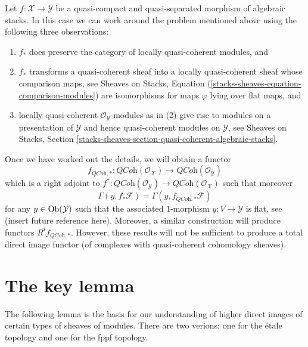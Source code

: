 \medskip\noindent
Let $f : \mathcal{X} \to \mathcal{Y}$ be a quasi-compact and
quasi-separated morphism of algebraic stacks. In this case we can
work around the problem mentioned above using the following
three observations:
\begin{enumerate}
\item $f_*$ does preserve the category of locally quasi-coherent modules, and
\item $f_*$ transforms a quasi-coherent sheaf into a locally quasi-coherent
sheaf whose comparison maps, see
Sheaves on Stacks, Equation (\ref{stacks-sheaves-equation-comparison-modules})
are isomorphisms for maps $\varphi$ lying over flat maps, and
\item locally quasi-coherent $\mathcal{O}_\mathcal{Y}$-modules as in (2)
give rise to modules on a presentation of $\mathcal{Y}$ and hence
quasi-coherent modules on $\mathcal{Y}$, see
Sheaves on Stacks, Section
\ref{stacks-sheaves-section-quasi-coherent-algebraic-stacks}.
\end{enumerate}
Once we have worked out the details, we will obtain a functor
$$
f_{\textit{QCoh}, *} :
\textit{QCoh}(\mathcal{O}_\mathcal{X})
\longrightarrow
\textit{QCoh}(\mathcal{O}_\mathcal{Y})
$$
which is a right adjoint to
$f^* : \textit{QCoh}(\mathcal{O}_\mathcal{Y}) \to
\textit{QCoh}(\mathcal{O}_\mathcal{X})$
such that moreover
$$
\Gamma(y, f_*\mathcal{F}) = \Gamma(y, f_{\textit{QCoh}, *}\mathcal{F})
$$
for any $y \in \mathop{\rm Ob}\nolimits(\mathcal{Y})$ such that the associated
$1$-morphism $y : V \to \mathcal{Y}$ is flat, see (insert future
reference here).
Moreover, a similar construction will produce functors
$R^if_{\textit{QCoh}, *}$.
However, these results will not be sufficient to produce a
total direct image functor (of complexes with quasi-coherent
cohomology sheaves).




\section{The key lemma}
\label{section-key}

\noindent
The following lemma is the basis for our understanding of
higher direct images of certain types of sheaves of modules.
There are two verions: one for the \'etale topology and
one for the fppf topology.

